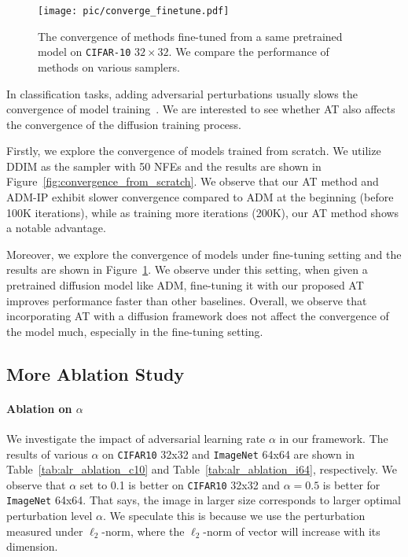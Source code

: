 \begin{figure}[t]
    \centering
    \texttt{[image: pic/converge\_finetune.pdf]}
    \caption{The convergence of methods fine-tuned from a same pretrained model on \texttt{CIFAR-10} $32\times32$. We compare the performance of methods on various samplers.}
    \label{fig:convergence_finetune}
\end{figure}

In classification tasks, adding adversarial perturbations usually slows the convergence of model training~\citep{freelb}. 
We are interested to see whether AT also affects the convergence of the diffusion training process. 

Firstly, we explore the convergence of models trained from scratch.
We utilize DDIM as the sampler with 50 NFEs and the results are shown in Figure~\ref{fig:convergence_from_scratch}. 
We observe that our AT method and ADM-IP exhibit slower convergence compared to ADM at the beginning (before 100K iterations), while as training more iterations (200K), our AT method shows a notable advantage.

Moreover, we explore the convergence of models under fine-tuning setting and the results are shown in Figure~\ref{fig:convergence_finetune}.
We observe under this setting, when given a pretrained diffusion model like ADM, fine-tuning it with our proposed AT improves performance faster than other baselines. 
Overall, we observe that incorporating AT with a diffusion framework does not affect the convergence of the model much, especially in the fine-tuning setting. 


\subsection{More Ablation Study}
\label{app:ablation_hyperparams}


\paragraph{Ablation on $\alpha$} We investigate the impact of adversarial learning rate $\alpha$ in our framework.
The results of various $\alpha$ on \texttt{CIFAR10} 32x32 and \texttt{ImageNet} 64x64 are shown in Table~\ref{tab:alr_ablation_c10} and Table~\ref{tab:alr_ablation_i64}, respectively.
We observe that $\alpha$ set to 0.1 is better on \texttt{CIFAR10} 32x32 and $\alpha=0.5$ is better for \texttt{ImageNet} 64x64. That says, the image in larger size corresponds to larger optimal perturbation level $\alpha$. We speculate this is because we use the perturbation measured under $\ell_{2}$-norm, where the $\ell_{2}$-norm of vector will increase with its dimension.

